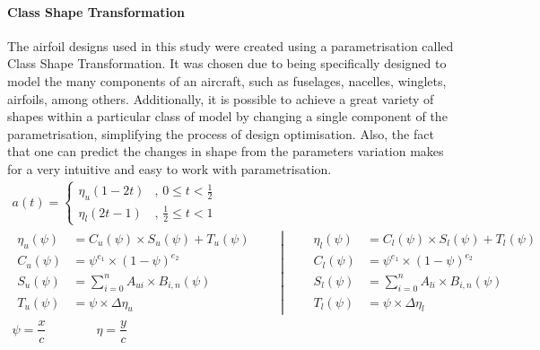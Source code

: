 \paragraph{Class Shape Transformation} The airfoil designs used in this study were created using a parametrisation called Class Shape Transformation. It was chosen due to being specifically designed to model the many components of an aircraft, such as fuselages, nacelles, winglets, airfoils, among others. Additionally, it is possible to achieve a great variety of shapes within a particular class of model by changing a single component of the parametrisation, simplifying the process of design optimisation. Also, the fact that one can predict the changes in shape from the parameters variation makes for a very intuitive and easy to work with parametrisation.
\begin{equation*}
\begin{gathered}
a(t) = \begin{cases}
\eta_u(1-2t) & \text{, } 0 \leq t < \frac{1}{2}\\
\eta_l(2t-1) & \text{, } \frac{1}{2} \leq t < 1
\end{cases}\\[1pc]
\left.
\begin{aligned}
\eta_u(\psi) &= C_u(\psi) \times S_u(\psi) + T_u(\psi)\\[0.75pc]
C_u(\psi) &= \psi ^{e_1} \times (1 - \psi) ^ {e_2}\\
S_u(\psi) &= \sum_{i=0}^{n} A_{ui} \times B_{i,n}(\psi)\\
T_u(\psi) &= \psi \times \Delta\eta_u
\end{aligned}
\quad\quad\right|\quad\quad
\begin{aligned}
\eta_l(\psi) &= C_l(\psi) \times S_l(\psi) + T_l(\psi)\\[0.75pc]
C_l(\psi) &= \psi ^{e_1} \times (1 - \psi) ^ {e_2}\\
S_l(\psi) &= \sum_{i=0}^{n} A_{li} \times B_{i,n}(\psi)\\
T_l(\psi) &= \psi \times \Delta\eta_l
\end{aligned}\\[1pc]
\psi = \dfrac{x}{c}
\quad\quad\quad\quad
\eta = \dfrac{y}{c}
\end{gathered}
\end{equation*}

